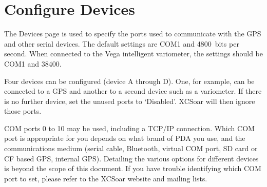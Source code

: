 \section{Configure Devices} \label{conf:comdevices}

The Devices page is used to specify the ports used to communicate with
the GPS and other serial devices. The default settings are COM1 and
4800~bits per second.  When connected to the Vega intelligent
variometer, the settings should be COM1 and 38400.

Four devices can be configured (device A through D). One, for
example, can be connected to a GPS and another to a
second device such as a variometer.  If there is no further device, 
set the unused ports to `Disabled'.  XCSoar will then ignore those ports.

COM ports 0 to 10 may be used, including a TCP/IP connection.  
Which COM port is appropriate for you
depends on what brand of PDA you use, and the communications medium
(serial cable, Bluetooth, virtual COM port, SD card or CF based GPS,
internal GPS).  Detailing the various options for different devices is
beyond the scope of this document.  If you have trouble identifying
which COM port to set, please refer to the XCSoar website and mailing
lists.

